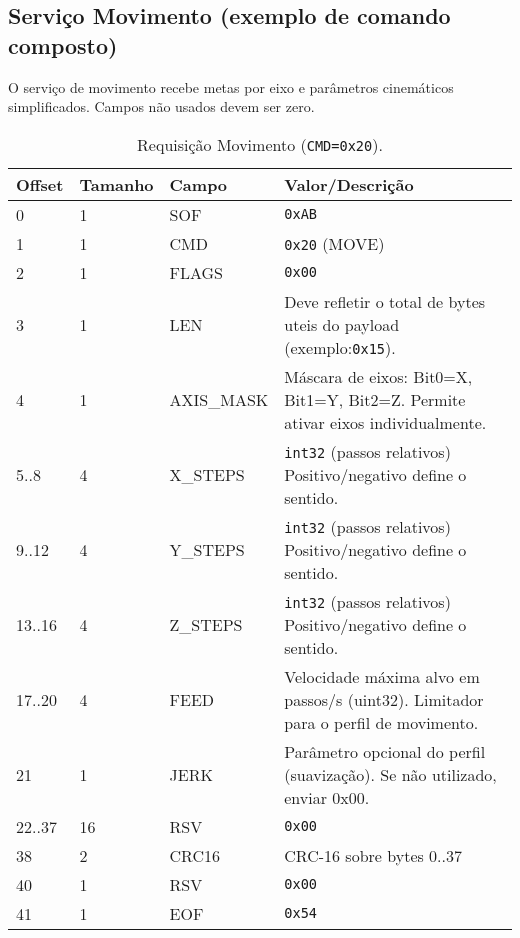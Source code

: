\subsection*{Serviço Movimento (exemplo de comando composto)}

O serviço de movimento recebe metas por eixo e parâmetros cinemáticos simplificados.
Campos não usados devem ser zero.

\begin{table}[H]
  \centering
  \caption{Requisição Movimento (\texttt{CMD=0x20}).}
  \label{tab:spi-move-req}
  \setlength{\tabcolsep}{4pt}\footnotesize
  \begin{tabularx}{\textwidth}{lllX}
    \toprule
    Offset & Tamanho & Campo & Valor/Descrição \\
    \midrule
    0 & 1 & SOF & \texttt{0xAB} \\
    1 & 1 & CMD & \texttt{0x20} (MOVE) \\
    2 & 1 & FLAGS & \texttt{0x00} \\
    3 & 1 & LEN & Deve refletir o total de bytes uteis do payload (exemplo:\texttt{0x15}). \\
    4 & 1 & AXIS\_MASK & M\'ascara de eixos: Bit0=X, Bit1=Y, Bit2=Z. Permite ativar eixos individualmente. \\
    5..8 & 4 & X\_STEPS & \texttt{int32} (passos relativos) Positivo/negativo define o sentido. \\
    9..12 & 4 & Y\_STEPS & \texttt{int32} (passos relativos)  Positivo/negativo define o sentido.\\
    13..16 & 4 & Z\_STEPS & \texttt{int32} (passos relativos) Positivo/negativo define o sentido. \\
    17..20 & 4 & FEED & Velocidade m\'axima alvo em passos/s (uint32). Limitador para o perfil de movimento. \\
    21 & 1 & JERK & Par\^ametro opcional do perfil (suaviza\c{c}\~ao). Se n\~ao utilizado, enviar 0x00.  \\
    22..37 & 16 & RSV & \texttt{0x00} \\
    38 & 2 & CRC16 & CRC-16 sobre bytes 0..37 \\
    40 & 1 & RSV & \texttt{0x00} \\
    41 & 1 & EOF & \texttt{0x54} \\
    \bottomrule
  \end{tabularx}
\end{table}

